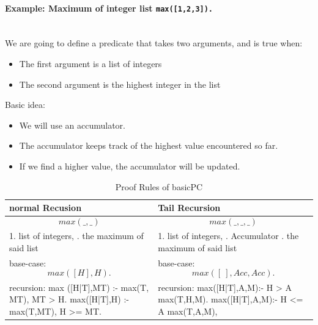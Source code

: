 \paragraph{Example: Maximum of integer list \lstinline|max([1,2,3]).|}\hfill \\
We are going to define a predicate that takes two arguments, and is true when:
\begin{itemize}
	\item The first argument is a list of integers
	\item The second argument is the highest integer in the list
\end{itemize}
Basic idea:
\begin{itemize}
	\item We will use an accumulator.
	\item The accumulator keeps track of the highest value encountered so far.
	\item If we find a higher value, the accumulator will be updated.
\end{itemize}
\begin{table}[h]
	\centering
	\begin{tabu} to 
		\toprule
		normal Recusion & Tail Recursion \\
		\midrule
		\tabmath\[max(\_,\_)\] &
		\tabmath\[max(\_,\_, \_)\] \\
		1. list of integers, . the maximum of said list\newline  &
		1. list of integers, . Accumulator . the maximum of said list \\
		\midrule
		base-case: \tabmath\[ max( [ H ] , H). \] &
		base-case: \tabmath\[ max( [ \: ] , Acc, Acc). \] \\
		recursion: \newline
		max ([H|T],MT) :- max(T, MT),\newline
		\hspace*{80pt}  MT > H. \newline
		max([H|T],H) :- max(T,MT),\newline
		\hspace*{70pt} H >= MT.&
		recursion: \newline
		max([H|T],A,M):- H > A \newline
		\hspace*{80pt} max(T,H,M). \newline
		max([H|T],A,M):- H <= A \newline
		\hspace*{80pt} max(T,A,M), \\
		\bottomrule
	\end{tabu}
	\label{tbl:ProofRulesBasicPC}
	\caption{Proof Rules of basicPC}
\end{table}
